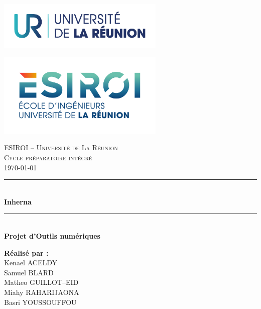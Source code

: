 \documentclass[a4paper,12pt,openany,oneside]{article}
\begin{document}
\begin{titlepage}

    \begin{minipage}{0.49\textwidth}
        \includegraphics[width=0.6\textwidth]{./Theme_LaTeX/Icones/LOGO_UR}
    \end{minipage}
    \hfill
    \begin{minipage}{0.49\textwidth}
        \begin{flushright}
        \includegraphics[width=0.6\textwidth]{./Theme_LaTeX/Icones/LOGO}
        \end{flushright}
    \end{minipage}
    
    \vspace{3cm}
    
    \begin{center}
        \textsc{\LARGE ESIROI -- Université de La Réunion}\\[0.5cm]
        \textsc{\Large Cycle préparatoire intégré}\\[0.5cm]
        \textsc{\large\mydate \today}
            \par \normalsize \normalfont
    
        \rule{\linewidth}{0.5mm} \\[0.4cm]
        {\huge \bfseries Inherna}\\[0.4cm]
        \rule{\linewidth}{0.5mm} \\[1.5cm]
    
        {\Large \bfseries Projet d'Outils numériques}\\[1cm]
    \end{center}
    
    \vspace{0.5cm}
    
    \begin{flushleft}
        \textbf{Réalisé par :}\\
        Kenael ACELDY\\
        Samuel BLARD\\
        Matheo GUILLOT--EID\\
        Miahy RAHARIJAONA\\
        Basri YOUSSOUFFOU\\[0.5cm]
    

\end{flushleft}
\end{titlepage}
\end{document}
